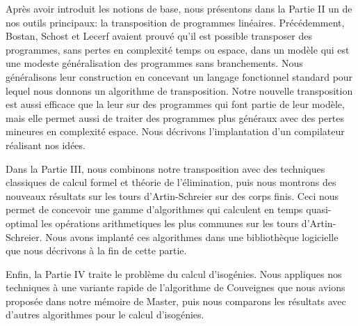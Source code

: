 Après avoir introduit les notions de base, nous présentons dans la
Partie II un de nos outils principaux: la transposition de programmes
linéaires. Précédemment, Bostan, Schost et Lecerf avaient prouvé qu'il
est possible transposer des programmes, sans pertes en complexité
temps ou espace, dans un modèle qui est une modeste généralisation des
programmes sans branchements. Nous généralisons leur construction en
concevant un langage fonctionnel standard pour lequel nous donnons un
algorithme de transposition. Notre nouvelle transposition est aussi
efficace que la leur sur des programmes qui font partie de leur
modèle, mais elle permet aussi de traiter des programmes plus généraux
avec des pertes mineures en complexité espace. Nous décrivons
l'implantation d'un compilateur réalisant nos idées.

Dans la Partie III, nous combinons notre transposition avec des
techniques classiques de calcul formel et théorie de l'élimination,
puis nous montrons des nouveaux résultats sur les tours
d'Artin-Schreier sur des corps finis. Ceci nous permet de concevoir
une gamme d'algorithmes qui calculent en temps quasi-optimal les
opérations arithmetiques les plus communes sur les tours
d'Artin-Schreier. Nous avons implanté ces algorithmes dans une
bibliothèque logicielle que nous décrivons à la fin de cette partie.

Enfin, la Partie IV traite le problème du calcul d'isogénies. Nous
appliques nos techniques à une variante rapide de l'algorithme de
Couveignes que nous avions proposée dans notre mémoire de Master, puis
nous comparons les résultats avec d'autres algorithmes pour le calcul
d'isogénies.


%
